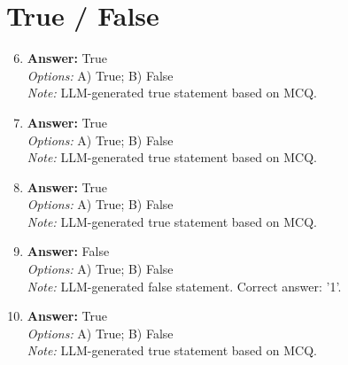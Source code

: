 \documentclass[12pt]{article}
\begin{document}
\section*{True / False}
\begin{enumerate}[label=\arabic*.]
\setcounter{enumi}{5}
\item \textbf{Answer:} True
\\ \textit{Options:} A) True; B) False
\\ \textit{Note:} LLM-generated true statement based on MCQ.
\item \textbf{Answer:} True
\\ \textit{Options:} A) True; B) False
\\ \textit{Note:} LLM-generated true statement based on MCQ.
\item \textbf{Answer:} True
\\ \textit{Options:} A) True; B) False
\\ \textit{Note:} LLM-generated true statement based on MCQ.
\item \textbf{Answer:} False
\\ \textit{Options:} A) True; B) False
\\ \textit{Note:} LLM-generated false statement. Correct answer: '1'.
\item \textbf{Answer:} True
\\ \textit{Options:} A) True; B) False
\\ \textit{Note:} LLM-generated true statement based on MCQ.
\end{enumerate}
\end{document}
